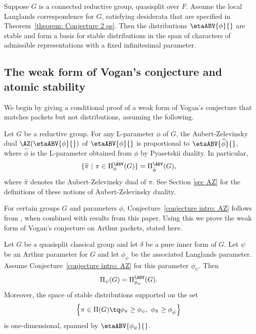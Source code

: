 \documentclass[11pt,letterpaper]{amsart}
\numberwithin{equation}{section}
\begin{document}
\begin{theorem}\label{theorem: ABV distributions form a basis intro}
   Suppose $G$ is a connected reductive group, quasisplit over $F$.
   Assume the local Langlands correspondence for $G$, satisfying desiderata that are specified in Theorem~\ref{theorem: Conjecture 2 qs}. 
   Then the distributions $\etaABV{\phi}{}$ are stable and form a basis for stable distributions in the span of characters of admissible representations with a fixed infinitesimal parameter.
\end{theorem}


\subsection{The weak form of Vogan's conjecture and atomic stability}

We begin by giving a conditional proof of a weak form of Vogan's conjecture that matches packets but not distributions, assuming the following. 

\begin{conjecture}
\label{conjecture intro: AZ}
Let $G$ be a reductive group. 
For any L-parameter $\phi$ of $G$, the Aubert-Zelevinsky dual
$\AZ (\etaABV{\phi}{})$ of $\etaABV{\phi}{}$ is proportional to $\etaABV{\widehat{\phi}}{}$, where ${\hat\phi}$ is the L-parameter obtained from $\phi$ by Pyasetskii duality.
In particular,
\[
\{\widehat{\pi} \ | \ \pi\in\Pi^\ABV_{\phi}(G)\}
=
\Pi^\ABV_{\hat\phi}(G),
\]
where $\widehat{\pi}$ denotes the Aubert-Zelevinsky dual of $\pi$. See Section \ref{sec AZ} for the definitions of these notions of Aubert-Zelevinsky duality.
\end{conjecture}
\noindent
For certain groups $G$ and parameters $\phi$, Conjecture~\ref{conjecture intro: AZ} follows from \cite{AO26}, when combined with results from this paper. 
Using this we prove the weak form of Vogan's conjecture on Arthur packets, stated here.

\begin{theorem}
\label{theorem intro: Vogan's conjecture, atomic}  
Let $G$ be a quasisplit classical group and let $\delta$ be a pure inner form of $G$.
Let $\psi$ be an Arthur parameter for $G$ and let $\phi_\psi$ be the associated Langlands parameter. 
Assume Conjecture~\ref{conjecture intro: AZ} for this parameter $\phi_\psi$.
Then
\[
\Pi_\psi(G) = \Pi^\ABV_{\phi_\psi}(G).
\]
Moreover, the space of stable distributions supported on the set
\begin{align}\label{equation intro: atomic}
    \left\{ \pi \in \Pi(G) \tq \phi_\pi \geq \phi_\psi,\ \phi_{\hat \pi} \geq \phi_{\hat \psi}
\right\}
\end{align}
is one-dimensional, spanned by $\etaABV{\phi_\psi}{}$.
\end{theorem}
\end{document}
